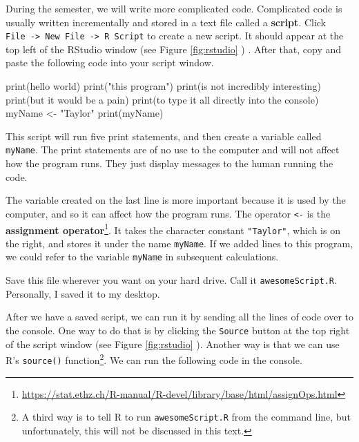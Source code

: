 \documentclass[
  12pt,
  krantz2]{krantz}
\makeatletter
\newenvironment{Shaded}{\begin{snugshade}}{\end{snugshade}}
\newcommand{\FunctionTok}[1]{\textcolor[rgb]{0,0,0}{#1}}
\newcommand{\NormalTok}[1]{#1}
\newcommand{\OtherTok}[1]{\textcolor[rgb]{0.37,0.37,0.37}{#1}}
\newcommand{\StringTok}[1]{\textcolor[rgb]{0.5,0.5,0.5}{#1}}
\renewcommand{\href}[2]{#2\footnote{\url{#1}}}
\newenvironment{kframe}{%
\medskip{}
\setlength{\fboxsep}{.8em}
 \def\at@end@of@kframe{}%
 \ifinner\ifhmode%
  \def\at@end@of@kframe{\end{minipage}}%
  \begin{minipage}{\columnwidth}%
 \fi\fi%
 \def\FrameCommand##1{\hskip\@totalleftmargin \hskip-\fboxsep
 \colorbox{shadecolor}{##1}\hskip-\fboxsep
     \hskip-\linewidth \hskip-\@totalleftmargin \hskip\columnwidth}%
 \MakeFramed {\advance\hsize-\width
   \@totalleftmargin\z@ \linewidth\hsize
   \@setminipage}}%
 {\par\unskip\endMakeFramed%
 \at@end@of@kframe}
\renewenvironment{Shaded}{\begin{kframe}}{\end{kframe}}
\makeatother
\begin{document}
During the semester, we will write more complicated code. Complicated code is usually written incrementally and stored in a text file called a \textbf{script}. Click \texttt{File\ -\textgreater{}\ New\ File\ -\textgreater{}\ R\ Script} to create a new script. It should appear at the top left of the RStudio window (see Figure \ref{fig:rstudio} ) . After that, copy and paste the following code into your script window.

\begin{Shaded}
\begin{Highlighting}[]
\FunctionTok{print}\NormalTok{(}\StringTok{\textquotesingle{}hello world\textquotesingle{}}\NormalTok{)}
\FunctionTok{print}\NormalTok{(}\StringTok{"this program"}\NormalTok{)}
\FunctionTok{print}\NormalTok{(}\StringTok{\textquotesingle{}is not incredibly interesting\textquotesingle{}}\NormalTok{)}
\FunctionTok{print}\NormalTok{(}\StringTok{\textquotesingle{}but it would be a pain\textquotesingle{}}\NormalTok{)}
\FunctionTok{print}\NormalTok{(}\StringTok{\textquotesingle{}to type it all directly into the console\textquotesingle{}}\NormalTok{)}
\NormalTok{myName }\OtherTok{\textless{}{-}} \StringTok{"Taylor"}
\FunctionTok{print}\NormalTok{(myName)}
\end{Highlighting}
\end{Shaded}

This script will run five print statements, and then create a variable called \texttt{myName}. The print statements are of no use to the computer and will not affect how the program runs. They just display messages to the human running the code.

The variable created on the last line is more important because it is used by the computer, and so it can affect how the program runs. The operator \texttt{\textless{}-} is the \href{https://stat.ethz.ch/R-manual/R-devel/library/base/html/assignOps.html}{\textbf{assignment operator}}. It takes the character constant \texttt{"Taylor"}, which is on the right, and stores it under the name \texttt{myName}. If we added lines to this program, we could refer to the variable \texttt{myName} in subsequent calculations.

Save this file wherever you want on your hard drive. Call it \texttt{awesomeScript.R}. Personally, I saved it to my desktop.

After we have a saved script, we can run it by sending all the lines of code over to the console. One way to do that is by clicking the \texttt{Source} button at the top right of the script window (see Figure \ref{fig:rstudio} ). Another way is that we can use R's \texttt{source()} function\footnote{A third way is to tell R to run \texttt{awesomeScript.R} from the command line, but unfortunately, this will not be discussed in this text.}. We can run the following code in the console.
\end{document}
